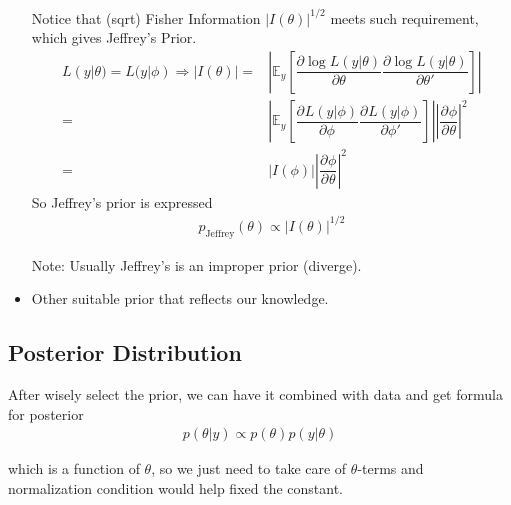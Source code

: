\begin{itemize}[topsep=2pt,itemsep=0pt]
    Notice that (sqrt) Fisher Information $ |I(\theta) |^{1/2} $ meets such requirement, which gives Jeffrey's Prior.
    \begin{align}
        L(y|\theta )=L(y|\phi ) \Rightarrow  |I(\theta )|=&\left\vert\mathbb{E}_y\left[ \dfrac{\partial \log L(y|\theta ) }{\partial \theta  } \dfrac{\partial \log L(y|\theta ) }{\partial \theta'  } \right] \right\vert\\
        =&\left\vert\mathbb{E}_y\left[ \dfrac{\partial^{}L(y|\phi )  }{\partial \phi  ^{} }\dfrac{\partial^{}L(y|\phi )  }{\partial \phi' } \right]\right\vert \left| \dfrac{\partial^{} \phi }{\partial ^{} \theta } \right|^2\\
        =&|I(\phi )|\left| \dfrac{\partial^{} \phi }{\partial ^{} \theta } \right|^2
    \end{align}
    So Jeffrey's prior is expressed 
    \begin{align*}
        p_\mathrm{ Jeffrey }(\theta )\propto |I(\theta )|^{1/2} 
    \end{align*}
    
    

    Note: Usually Jeffrey's is an improper prior (diverge).
    
    \item Other suitable prior that reflects our knowledge.
    
     
\end{itemize}


\subsection{Posterior Distribution}
After wisely select the prior, we can have it combined with data and get formula for posterior
\begin{align}
    p(\theta |y)\propto p(\theta )p(y|\theta ) 
\end{align}

which is a function of $ \theta  $, so we just need to take care of $ \theta  $-terms and normalization condition would help fixed the constant.

